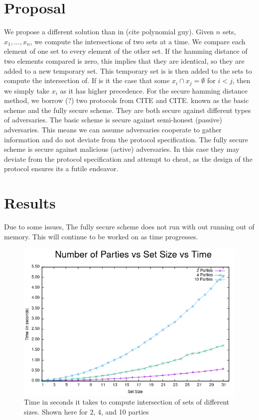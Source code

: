 \documentclass[12pt]{article}
\begin{document}
\section{Proposal}
We propose a different solution than in (cite polynomial guy). Given $n$ sets, $x_1,...,x_n$, we compute the intersections of two sets at a time. We compare each element of one set to every element of the other set. If the hamming distance of two elements compared is zero, this implies that they are identical, so they are added to a new temporary set. This temporary set is is then added to the sets to compute the intersection of. If is it the case that some $x_i \cap x_j = \emptyset$ for $i  < j$, then we simply take $x_i$ as it has higher precedence. For the secure hamming distance method, we borrow (?) two protocols from CITE and CITE. known as the basic scheme and the fully secure scheme. They are both secure against different types of adversaries. The basic scheme is secure against semi-honest (passive) adversaries. This means we can assume adversaries cooperate to gather information and do not deviate from the protocol specification. The fully secure scheme is secure against malicious (active) adversaries. In this case they may deviate from the protocol specification and attempt to cheat, as the design of the protocol ensures its a futile endeavor. 


\section{Results}
Due to some issues, The fully secure scheme does not run with out running out of memory. This will continue to be worked on as time progresses.

\begin{figure}[ht]
\centering
\includegraphics[scale=0.64]{g6} 
\caption{Time in seconds it takes to compute intersection of sets of different sizes. Shown here for 2, 4, and 10 parties}
\end{figure}
\end{document}
